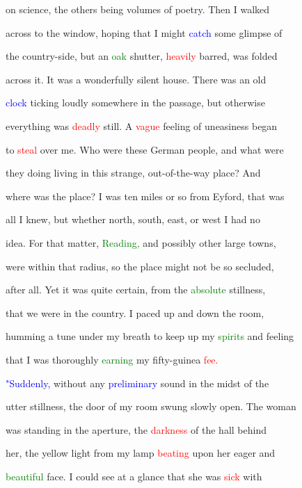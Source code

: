  on science, the others being volumes of poetry. Then I walked

 across to the window, hoping that I might \textcolor{blue}{catch} some glimpse of

 the country-side, but an \textcolor{green}{oak} shutter, \textcolor{red}{heavily} barred, was folded

 across it. It was a \textcolor{BurntOrange}{wonderfully} silent house. There was an old

 \textcolor{blue}{clock} ticking loudly somewhere in the passage, but otherwise

 everything was \textcolor{red}{deadly} still. A \textcolor{red}{vague} feeling of \textcolor{BurntOrange}{uneasiness} began

 to \textcolor{red}{steal} over me. Who were these German people, and what were

 they doing living in this strange, out-of-the-way place? And

 where was the place? I was ten miles or so from Eyford, that was

 all I knew, but whether north, south, east, or west I had no

 idea. For that matter, \textcolor{green}{Reading,} and possibly other large towns,

 were within that radius, so the place might not be so secluded,

 after all. Yet it was quite certain, from the \textcolor{green}{absolute} \textcolor{BurntOrange}{stillness,}

 that we were in the country. I paced up and down the room,

 humming a tune under my breath to keep up my \textcolor{green}{spirits} and feeling

 that I was thoroughly \textcolor{green}{earning} my fifty-guinea \textcolor{red}{fee.}



 \textcolor{blue}{"Suddenly,} without any \textcolor{blue}{preliminary} sound in the midst of the

 utter \textcolor{BurntOrange}{stillness,} the door of my room swung slowly open. The woman

 was standing in the aperture, the \textcolor{red}{darkness} of the hall behind

 her, the yellow light from my lamp \textcolor{red}{beating} upon her \textcolor{BurntOrange}{eager} and

 \textcolor{green}{beautiful} face. I could see at a glance that she was \textcolor{red}{sick} with

